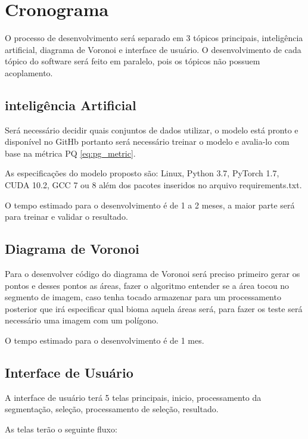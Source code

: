 \section{Cronograma}

O processo de desenvolvimento será separado em 3 tópicos principais, inteligência artificial, diagrama de Voronoi e interface de usuário. O desenvolvimento de cada tópico do software será feito em paralelo, pois os tópicos não possuem acoplamento.

\subsection*{inteligência Artificial}

Será necessário decidir quais conjuntos de dados utilizar, o modelo está pronto e disponível no GitHb \cite{mohan2020efficientps} portanto será necessário treinar o modelo e avalia-lo com base na métrica PQ \cref{eq:pg_metric}.

As especificações do modelo proposto são: Linux, Python 3.7, PyTorch 1.7, CUDA 10.2, GCC 7 ou 8 além dos pacotes inseridos no arquivo requirements.txt.

O tempo estimado para o desenvolvimento é de 1 a 2 meses, a maior parte será para treinar e validar o resultado.

\subsection*{Diagrama de Voronoi}

Para o desenvolver código do diagrama de Voronoi será preciso primeiro gerar os pontos e desses pontos as áreas, fazer o algoritmo entender se a área tocou no segmento de imagem, caso tenha tocado armazenar para um processamento posterior que irá especificar qual bioma aquela áreas será, para fazer os teste será necessário uma imagem com um polígono.

O tempo estimado para o desenvolvimento é de 1 mes.

\subsection*{Interface de Usuário}

A interface de usuário terá 5 telas principais, inicio, processamento da segmentação, seleção, processamento de seleção, resultado. 

As telas terão o seguinte fluxo:

